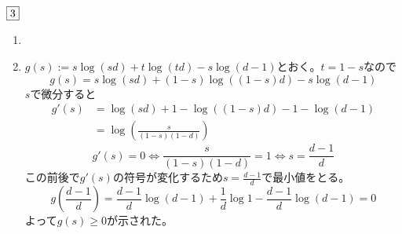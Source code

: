 \begin{souanswer} %
	$\fbox{3}$
\begin{enumerate}
	\item 
{}

	\item $g(s):= s\log{(sd)}+ t\log{(td)}- s\log{(d- 1)}$とおく。$t= 1- s$なので
\begin{equation*}
	g(s)= s\log{(sd)}+ (1- s)\log{((1- s)d)}- s\log{(d- 1)}
\end{equation*}
	$s$で微分すると
\begin{align*}
	g'(s)
	&= \log{(sd)}+ 1- \log{((1- s)d)}- 1- \log{(d- 1)}\\
	&= \log{\left(\frac{s}{(1- s)(1- d)}\right)}
\end{align*}
\begin{equation*}
	g'(s)= 0\iff \frac{s}{(1- s)(1- d)}= 1\iff s= \frac{d- 1}{d}
\end{equation*}
	この前後で$g'(s)$の符号が変化するため$s= \frac{d- 1}{d}$で最小値をとる。
\begin{equation*}
	g\left(\frac{d- 1}{d}\right)= \frac{d- 1}{d}\log{(d- 1)}+ \frac{1}{d}\log{1}- \frac{d- 1}{d}\log{(d- 1)}= 0
\end{equation*}
	よって$g(s)\ge 0$が示された。


\end{enumerate}
\end{souanswer}
